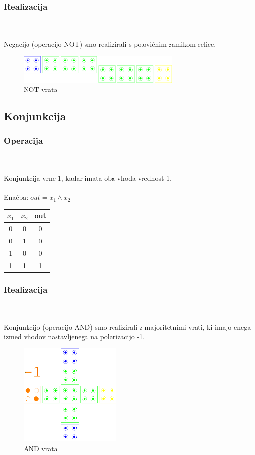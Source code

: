 \documentclass[seminar, slovene]{FRIreport}
\begin{document}
\subsubsection{Realizacija}\ \\ \ \\
Negacijo (operacijo NOT) smo realizirali s polovičnim zamikom celice.
\begin{figure}[H]
\begin{center}
\includegraphics[width=8cm]{qca/img/NOT}
\caption{NOT vrata}
\label{NOT}
\end{center}
\end{figure}
\subsection{Konjunkcija}
\subsubsection{Operacija}\ \\ \ \\
Konjunkcija vrne 1, kadar imata oba vhoda vrednost 1.
\ \\ \ \\
Enačba: $ out = x_1 \wedge x_2 $
\begin{table}[H]
\begin{tabular}{ | c | c || c | }\hline
$x_1$ & $x_2$ & out \\ \hline
0 & 0 & 0\\
0 & 1 & 0\\
1 & 0 & 0\\
1 & 1 & 1\\ \hline
\end{tabular}
\end{table}

\subsubsection{Realizacija}\ \\ \ \\
Konjunkcijo (operacijo AND) smo realizirali z majoritetnimi vrati, ki imajo enega izmed vhodov nastavljenega na polarizacijo -1.
\begin{figure}[H]
\begin{center}
\includegraphics[width=5cm]{qca/img/AND}
\caption{AND vrata}
\label{AND}
\end{center}
\end{figure}
\end{document}
